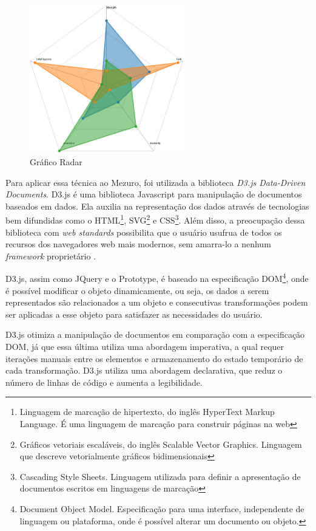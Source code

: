 \graphicspath{{figuras/}}
\begin{figure}[h]
\centering
\includegraphics[width=0.6\textwidth]{radar_chart}
\caption{Gráfico Radar \cite{alvarograves2014}}
\label{radar-chart}
\end{figure}

Para aplicar essa técnica ao Mezuro, foi utilizada a biblioteca \textit{D3.js Data-Driven Documents}. D3.js é uma biblioteca Javascript para manipulação de documentos baseados em dados. Ela auxilia na representação dos dados através de tecnologias bem difundidas como o HTML\footnote{Linguagem de marcação de hipertexto, do inglês HyperText Markup Language. É uma linguagem de marcação para construir páginas na web}, SVG\footnote{Gráficos vetoriais escaláveis, do inglês Scalable Vector Graphics. Linguagem que descreve vetorialmente gráficos bidimensionais} e CSS\footnote{Cascading Style Sheets. Linguagem utilizada para definir a apresentação de documentos escritos em linguagens de marcação}. Além disso, a preocupação dessa biblioteca com \textit{web standards} possibilita que o usuário usufrua de todos os recursos dos navegadores web mais modernos, sem amarra-lo a nenhum \textit{framework} proprietário \cite{d3js2014info}.

D3.js, assim como JQuery e o Prototype, é baseado na especificação DOM\footnote{Document Object Model. Especificação para uma interface, independente de linguagem ou plataforma, onde é possível alterar um documento ou objeto.}, onde é possível modificar o objeto dinamicamente, ou seja, os dados a serem representados são relacionados a um objeto e consecutivas transformações podem ser aplicadas a esse objeto para satisfazer as necessidades do usuário. 

D3.js otimiza a manipulação de documentos em comparação com a especificação DOM, já que essa última utiliza uma abordagem imperativa, a qual requer iterações manuais entre os elementos e armazenamento do estado temporário de cada transformação. D3.js utiliza uma abordagem declarativa, que reduz o número de linhas de código e aumenta a legibilidade.

